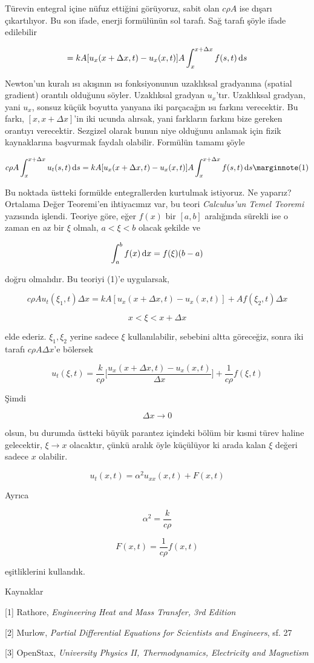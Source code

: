 \documentclass[12pt,fleqn]{article}\usepackage{../../common}
\begin{document}
Türevin entegral içine nüfuz ettiğini görüyoruz, sabit olan $c\rho A$ ise
dışarı çıkartılıyor. Bu son ifade, enerji formülünün sol tarafı. Sağ tarafı
şöyle ifade edilebilir

$$ = kA [ u_x(x+\Delta x,t) - u_x(x,t)] A \int _{x}^{x+\Delta x} f(s,t) \,\mathrm{d} s $$

Newton'un kuralı ısı akışının ısı fonksiyonunun uzaklıksal gradyanına
(spatial gradient) orantılı olduğunu söyler. Uzaklıksal gradyan
$u_x$'tır. Uzaklıksal gradyan, yani $u_x$, sonsuz küçük boyutta yanyana iki
parçacağın ısı farkını verecektir. Bu farkı, $[x,x+\Delta x]$'in iki ucunda
alırsak, yani farkların farkını bize gereken orantıyı verecektir. Sezgizel
olarak bunun niye olduğunu anlamak için fizik kaynaklarına başvurmak
faydalı olabilir. Formülün tamamı şöyle

$$
c\rho A  \int _{ x}^{x+\Delta x} u_t(s,t) \ud s =
kA [ u_x(x+\Delta x,t) - u_x(x,t)] A \int _{x}^{x+\Delta x} f(s,t) \ud s 
\mlabel{1}
$$

Bu noktada üstteki formülde entegrallerden kurtulmak istiyoruz. Ne
yaparız?  Ortalama Değer Teoremi'en ihtiyacımız var, bu teori {\em
  Calculus'un Temel Teoremi} yazısında işlendi. Teoriye göre, eğer $f(x)$
bir $[a,b]$ aralığında sürekli ise o zaman en az bir $\xi$ olmalı, $a <
\xi < b$ olacak şekilde ve

$$ \int _{ a}^{b} f(x) \,\mathrm{d} x = f(\xi)(b-a)  $$

doğru olmalıdır. Bu teoriyi (1)'e uygularsak,

$$ c\rho A u_t(\xi_1,t)\Delta x = 
kA[u_x(x+\Delta x, t) - u_x(x,t)] + 
Af(\xi_2,t)\Delta x
 $$

$$ x < \xi < x+\Delta x $$

elde ederiz. $\xi_1,\xi_2$ yerine sadece $\xi$ kullanılabilir, sebebini
altta göreceğiz, sonra iki tarafı $c\rho A \Delta x$'e bölersek


$$
u_t(\xi,t) =  \frac{k}{c\rho}
\bigg[
\frac{u_x(x+\Delta x,t) - u_x(x,t)} {\Delta x}
\bigg]
+ \frac{ 1}{c\rho}f(\xi,t)
$$

Şimdi 

$$ \Delta x \to 0 $$

olsun, bu durumda üstteki büyük parantez içindeki bölüm bir kısmi türev
haline gelecektir, $\xi \to x$ olacaktır, çünkü aralık öyle küçülüyor ki
arada kalan $\xi$ değeri sadece $x$ olabilir.

$$ u_t(x,t) = \alpha^2u_{xx}(x,t) + F(x,t) $$

Ayrıca

$$ \alpha^2 = \frac{k}{c\rho} $$

$$ F(x,t) = \frac{1}{c\rho}f(x,t) $$

eşitliklerini kullandık.



Kaynaklar

[1] Rathore, {\em Engineering Heat and Mass Transfer, 3rd Edition}

[2] Murlow, {\em Partial Differential Equations for Scientists and Engineers}, sf. 27

[3] OpenStax, {\em University Physics II, Thermodynamics, Electricity and Magnetism}
\end{document}
